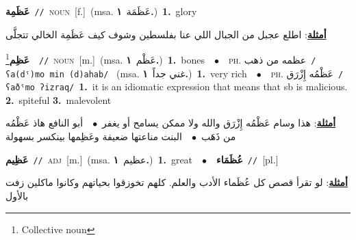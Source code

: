 \documentclass[10pt,a4paper,twoside]{article} %
\begin{document}
\begin{multicols}{2}
{\setlength\topsep{0pt}\textbf{\foreignlanguage{arabic}{عَظَمِة}}\ {\color{gray}\texttt{//}\color{black}}\ \textsc{noun}\ [f.]\ \color{gray}(msa. \foreignlanguage{arabic}{عَظَمَة}~\foreignlanguage{arabic}{\textbf{١.}})\color{black}\ \textbf{1.}~glory\  \begin{flushright}\color{gray}\foreignlanguage{arabic}{\textbf{\underline{\foreignlanguage{arabic}{أمثلة}}}: اطلع عجبل من الجبال اللي عنا بفلسطين وشوف كيف عَظَمِة الخالي تتجلَّى}\end{flushright}\color{black}} \vspace{2mm}

{\setlength\topsep{0pt}\textbf{\foreignlanguage{arabic}{عَظِم}}\footnote{Collective noun}\ \ {\color{gray}\texttt{//}\color{black}}\ \textsc{noun}\ [m.]\ \color{gray}(msa. \foreignlanguage{arabic}{عَظْم}~\foreignlanguage{arabic}{\textbf{١.}})\color{black}\ \textbf{1.}~bones\ \ $\bullet$\ \ \textsc{ph.} \color{gray} \foreignlanguage{arabic}{عظمه من ذهب}\color{black}\ {\color{gray}\texttt{/{\sffamily ʕa(dˤ)mo min (d)ahab}/}\color{black}}\ \color{gray} (msa. \foreignlanguage{arabic}{غني جداً}~\foreignlanguage{arabic}{\textbf{١.}})\color{black}\ \textbf{1.}~very rich\ \ $\bullet$\ \ \textsc{ph.} \color{gray} \foreignlanguage{arabic}{عَظْمُه إِزْرَق}\color{black}\ {\color{gray}\texttt{/{\sffamily ʕaðˤmo ʔizraq}/}\color{black}}\ \textbf{1.}~it is an idiomatic expression that means that sb is malicious.  \textbf{2.}~spiteful  \textbf{3.}~malevolent\  \begin{flushright}\color{gray}\foreignlanguage{arabic}{\textbf{\underline{\foreignlanguage{arabic}{أمثلة}}}: هذا وسام عَظْمُه إِزْرَق والله ولا ممكن يسامح أو يغفر\ $\bullet$\ \  أبو النافع هاذ عَظْمُه من ذَهَب\ $\bullet$\ \  البنت مناعتها ضعيفة وعَظِمها بينكسر بسهولة}\end{flushright}\color{black}} \vspace{2mm}

{\setlength\topsep{0pt}\textbf{\foreignlanguage{arabic}{عَظِيم}}\ {\color{gray}\texttt{//}\color{black}}\ \textsc{adj}\ [m.]\ \color{gray}(msa. \foreignlanguage{arabic}{عظيم}~\foreignlanguage{arabic}{\textbf{١.}})\color{black}\ \textbf{1.}~great\ \ $\bullet$\ \ \setlength\topsep{0pt}\textbf{\foreignlanguage{arabic}{عُظَمَاء}}\ {\color{gray}\texttt{//}\color{black}}\ [pl.]\  \begin{flushright}\color{gray}\foreignlanguage{arabic}{\textbf{\underline{\foreignlanguage{arabic}{أمثلة}}}: لو تقرأ قصص كل عُظَماء الأدب والعلم. كلهم تخوزقوا بحياتهم وكانوا ماكلين زفت بالأول}\end{flushright}\color{black}} \vspace{2mm}


\end{multicols}
\end{document}
